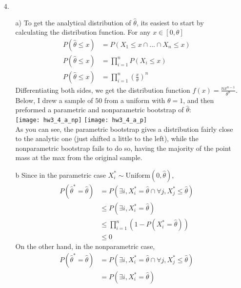 \documentclass[11pt]{article}
\theoremstyle{definition}
\begin{document}
\begin{itemize}
\begin{itemize}
        \end{itemize}
    \item[4.]
        \begin{itemize}
            \item[a)]
                To get the analytical distribution of \(\hat \theta\), its easiest to start by calculating the distribution function. For any $x\in[0,\theta]$
                \begin{align*}
                    P(\hat \theta \leq x) &= P(X_1\leq x \cap ... \cap X_n\leq x) \\
                    P(\hat \theta \leq x) &= \prod_{i=1}^n P(X_i\leq x) \\
                    P(\hat \theta \leq x) &= \prod_{i=1}^n \left(\frac{x}{\theta}\right)^n
                \end{align*}
                Differentiating both sides, we get the distribution function \(f(x)=\frac{nx^{n-1}}{\theta^n}\). Below, I drew a sample of $50$ from a uniform with $\theta=1$, and then preformed a parametric and nonparametric bootstrap of $\hat\theta$: \\
                \texttt{[image: hw3\_4\_a\_np]}
                \texttt{[image: hw3\_4\_a\_p]} \\
                As you can see, the parametric bootstrap gives a distribution fairly close to the analytic one (just shifted a little to the left), while the nonparametric bootstrap fails to do so, having the majority of the point mass at the max from the original sample.
            \item[b]
                Since in the parametric case \(X_i^*\sim \mbox{Uniform}(0,\hat\theta)\),
                \begin{align*}
                    P(\hat\theta^*=\hat\theta) &= P(\exists i, X_i^*=\hat\theta\cap \forall j, X_j^*\leq\hat\theta) \\
                    &\leq P(\exists i, X_i^*=\hat\theta) \\
                    &\leq \prod_{i=1}^n (1-P(X_i^*=\hat\theta)) \\
                    &\leq 0
                \end{align*}
                On the other hand, in the nonparametric case,
                \begin{align*}
                    P(\hat\theta^*=\hat\theta) &= P(\exists i, X_i^*=\hat\theta\cap \forall j, X_j^*\leq\hat\theta) \\
                    &= P(\exists i, X_i^*=\hat\theta) \\

\end{align*}
\end{itemize}
\end{itemize}
\end{document}
